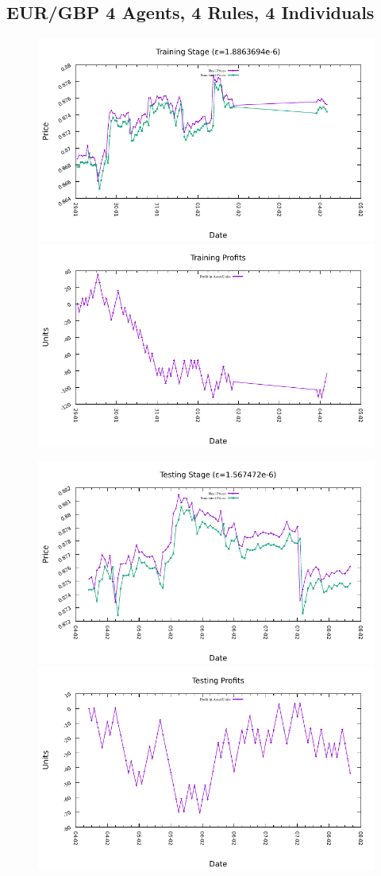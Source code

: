 







\subsection{EUR/GBP 4 Agents, 4 Rules, 4 Individuals}
\label{results:forecast-eur-gbp-4agents-4rules-4individuals}

\begin{figure}[htp]
\centering

\includegraphics[width=.45\textwidth]{img/plots/eur_gbp_h1-4agents-4rules-4ind-100gen_training_fit.pdf}\quad
\includegraphics[width=.45\textwidth]{img/plots/eur_gbp_h1-4agents-4rules-4ind-100gen_training_profits.pdf}

\medskip

\includegraphics[width=.45\textwidth]{img/plots/eur_gbp_h1-4agents-4rules-4ind-100gen_testing_fit.pdf}\quad
\includegraphics[width=.45\textwidth]{img/plots/eur_gbp_h1-4agents-4rules-4ind-100gen_testing_profits.pdf}


\end{figure}
